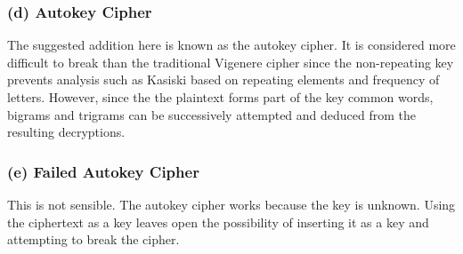 \documentclass{book}%
\begin{document}
\subsubsection*{(d) Autokey Cipher}
The suggested addition here is known as the autokey cipher. It is considered more difficult to break than the traditional Vigenere cipher since the non-repeating key prevents analysis such as Kasiski based on repeating elements and frequency of letters. However, since the the plaintext forms part of the key common words, bigrams and trigrams can be successively attempted and deduced from the resulting decryptions.
\subsubsection*{(e) Failed Autokey Cipher}
This is not sensible. The autokey cipher works because the key is unknown. Using the ciphertext as a key leaves open the possibility of inserting it as a key and attempting to break the cipher. 
\end{document}
